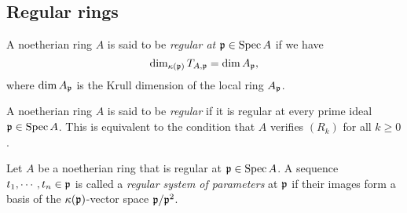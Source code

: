     
\subsection{Regular rings}





    \begin{definition}\label{def: regular ring}
        A noetherian ring \(A\) is said to be \emph{regular at \({\mathfrak{p}} \in \operatorname{Spec} A\)} if we have 
        \[ \dim_{{\kappa}({\mathfrak{p}})} T_{A,{\mathfrak{p}}} = \dim A_{\mathfrak{p}}, \]
        where \(\dim A_{\mathfrak{p}}\) is the Krull dimension of the local ring \(A_{\mathfrak{p}}\).
        
        A noetherian ring \(A\) is said to be \emph{regular} if it is regular at every prime ideal \({\mathfrak{p}} \in \operatorname{Spec} A\).
        This is equivalent to the condition that \(A\) verifies \((R_k)\) for all \(k \geq 0\).
    \end{definition}

    \begin{definition}\label{def: regular system of parameters}
        Let \(A\) be a noetherian ring that is regular at \({\mathfrak{p}} \in \operatorname{Spec} A\).
        A sequence \(t_1,\cdots,t_n \in {\mathfrak{p}}\) is called a \emph{regular system of parameters} at \({\mathfrak{p}}\) if their images form a basis of the \({\kappa}({\mathfrak{p}})\)-vector space \({\mathfrak{p}}/{\mathfrak{p}}^2\).
    \end{definition}

